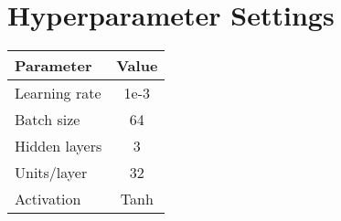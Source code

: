 \documentclass{article}
\begin{document}
\section{Hyperparameter Settings}
\begin{table}[h]
\centering
\begin{tabular}{|l|c|}
\hline
Parameter & Value \\
\hline
Learning rate & 1e-3 \\
Batch size & 64 \\
Hidden layers & 3 \\
Units/layer & 32 \\
Activation & Tanh \\
\hline
\end{tabular}
\end{table}

\newpage

\end{document}
